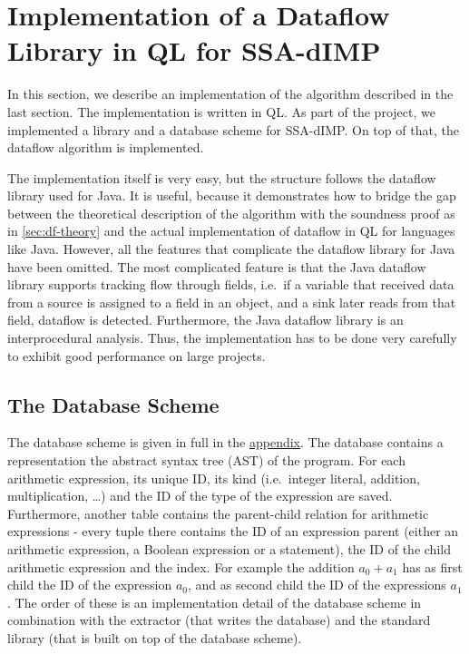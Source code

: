 \section{Implementation of a Dataflow Library in QL for SSA-dIMP}

In this section, we describe an implementation of the algorithm described in the
last section.
The implementation is written in QL.
As part of the project, we implemented a library and a database scheme for SSA-dIMP.
On top of that, the dataflow algorithm is implemented.

The implementation itself is very easy, but the structure follows the
dataflow library used for Java.
It is useful, because it demonstrates how to bridge the gap between
the theoretical description of the algorithm with the soundness proof
as in \autoref{sec:df-theory} and the actual implementation of dataflow
in QL for languages like Java.
However, all the features that complicate the dataflow library for Java have been 
omitted.
The most complicated feature is that the Java dataflow library supports tracking 
flow through fields, i.e.\ if a variable that received data from a source 
is assigned to a field in an object, and a sink later reads from that field,
dataflow is detected.
Furthermore, the Java dataflow library is an interprocedural analysis.
Thus, the implementation has to be done very carefully to exhibit good
performance on large projects.

\subsection{The Database Scheme}
The database scheme is given in full in the \hyperref[lst:dbscheme]{appendix}.
The database contains a representation the abstract syntax tree (AST) of the program.
For each arithmetic expression, its unique ID, its kind
(i.e.\ integer literal, addition, multiplication, \ldots) 
and the ID of the type of the expression are saved.
Furthermore, another table contains the parent-child relation for arithmetic 
expressions - every tuple there contains the ID of an expression parent 
(either an arithmetic expression, a Boolean expression or a statement),
the ID of the child arithmetic expression and the index.
For example the addition $a_0 + a_1$ has as first child the ID of the expression 
$a_0$, and as second child the ID of the expressions $a_1$.
The order of these is an implementation detail of the database scheme in combination
with the extractor (that writes the database) and the standard library 
(that is built on top of the database scheme).

